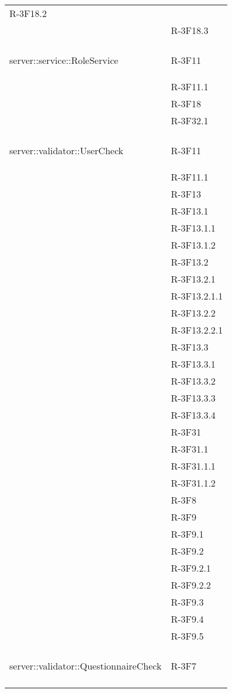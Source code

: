 \begin{longtable}{l p{3cm}}
	R-3F18.2 \tabularnewline &
	
	R-3F18.3 \tabularnewline &\tabularnewline
	\hline
	\hypertarget{server::service::RoleService}{server::service::RoleService} & R-3F11 \tabularnewline &
	
	R-3F11.1 \tabularnewline &
	
	R-3F18 \tabularnewline &
	
	R-3F32.1 \tabularnewline &\tabularnewline
	\hline
	\hypertarget{server::validator::UserCheck}{server::validator::UserCheck} & R-3F11 \tabularnewline &
	
	R-3F11.1 \tabularnewline &
	
	R-3F13 \tabularnewline &
	
	R-3F13.1 \tabularnewline &
	
	R-3F13.1.1 \tabularnewline &
	
	R-3F13.1.2 \tabularnewline &
	
	R-3F13.2 \tabularnewline &
	
	R-3F13.2.1 \tabularnewline &
	
	R-3F13.2.1.1 \tabularnewline &
	
	R-3F13.2.2 \tabularnewline &
	
	R-3F13.2.2.1 \tabularnewline &
	
	R-3F13.3 \tabularnewline &
	
	R-3F13.3.1 \tabularnewline &
	
	R-3F13.3.2 \tabularnewline &
	
	R-3F13.3.3 \tabularnewline &
	
	R-3F13.3.4 \tabularnewline &
	
	R-3F31 \tabularnewline &
	
	R-3F31.1 \tabularnewline &
	
	R-3F31.1.1 \tabularnewline &
	
	R-3F31.1.2 \tabularnewline &
	
	R-3F8 \tabularnewline &
	
	R-3F9 \tabularnewline &
	
	R-3F9.1 \tabularnewline &
	
	R-3F9.2 \tabularnewline &
	
	R-3F9.2.1 \tabularnewline &
	
	R-3F9.2.2 \tabularnewline &
	
	R-3F9.3 \tabularnewline &
	
	R-3F9.4 \tabularnewline &
	
	R-3F9.5 \tabularnewline &\tabularnewline
	\hline
	\hypertarget{server::validator::QuestionnaireCheck}{server::validator::QuestionnaireCheck} & R-3F7 \tabularnewline &
	

\end{longtable}
